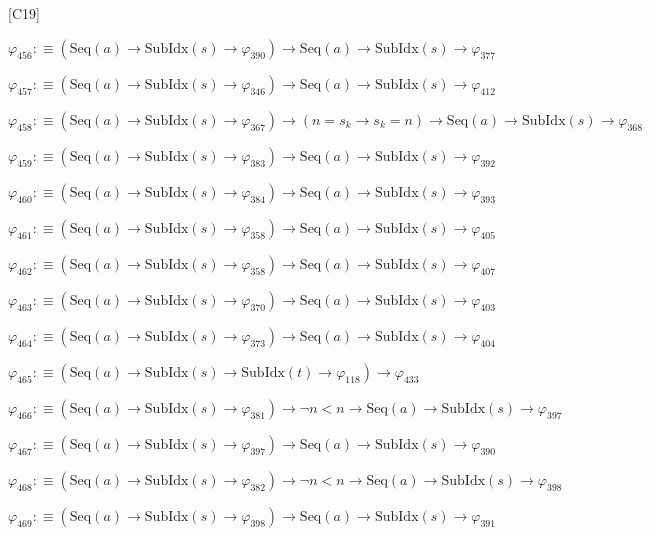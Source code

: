 \begin{fullproof}{[C19]}
\begin{abbrevlist}
\item $\varphi_{456} :\equiv (\mathrm{Seq}(a) \to \mathrm{SubIdx}(s) \to \varphi_{390}) \to \mathrm{Seq}(a) \to \mathrm{SubIdx}(s) \to \varphi_{377}$
\item $\varphi_{457} :\equiv (\mathrm{Seq}(a) \to \mathrm{SubIdx}(s) \to \varphi_{346}) \to \mathrm{Seq}(a) \to \mathrm{SubIdx}(s) \to \varphi_{412}$
\item $\varphi_{458} :\equiv (\mathrm{Seq}(a) \to \mathrm{SubIdx}(s) \to \varphi_{367}) \to (n = s_{k} \to s_{k} = n) \to \mathrm{Seq}(a) \to \mathrm{SubIdx}(s) \to \varphi_{368}$
\item $\varphi_{459} :\equiv (\mathrm{Seq}(a) \to \mathrm{SubIdx}(s) \to \varphi_{383}) \to \mathrm{Seq}(a) \to \mathrm{SubIdx}(s) \to \varphi_{392}$
\item $\varphi_{460} :\equiv (\mathrm{Seq}(a) \to \mathrm{SubIdx}(s) \to \varphi_{384}) \to \mathrm{Seq}(a) \to \mathrm{SubIdx}(s) \to \varphi_{393}$
\item $\varphi_{461} :\equiv (\mathrm{Seq}(a) \to \mathrm{SubIdx}(s) \to \varphi_{358}) \to \mathrm{Seq}(a) \to \mathrm{SubIdx}(s) \to \varphi_{405}$
\item $\varphi_{462} :\equiv (\mathrm{Seq}(a) \to \mathrm{SubIdx}(s) \to \varphi_{358}) \to \mathrm{Seq}(a) \to \mathrm{SubIdx}(s) \to \varphi_{407}$
\item $\varphi_{463} :\equiv (\mathrm{Seq}(a) \to \mathrm{SubIdx}(s) \to \varphi_{370}) \to \mathrm{Seq}(a) \to \mathrm{SubIdx}(s) \to \varphi_{403}$
\item $\varphi_{464} :\equiv (\mathrm{Seq}(a) \to \mathrm{SubIdx}(s) \to \varphi_{373}) \to \mathrm{Seq}(a) \to \mathrm{SubIdx}(s) \to \varphi_{404}$
\item $\varphi_{465} :\equiv (\mathrm{Seq}(a) \to \mathrm{SubIdx}(s) \to \mathrm{SubIdx}(t) \to \varphi_{118}) \to \varphi_{433}$
\item $\varphi_{466} :\equiv (\mathrm{Seq}(a) \to \mathrm{SubIdx}(s) \to \varphi_{381}) \to \neg n < n \to \mathrm{Seq}(a) \to \mathrm{SubIdx}(s) \to \varphi_{397}$
\item $\varphi_{467} :\equiv (\mathrm{Seq}(a) \to \mathrm{SubIdx}(s) \to \varphi_{397}) \to \mathrm{Seq}(a) \to \mathrm{SubIdx}(s) \to \varphi_{390}$
\item $\varphi_{468} :\equiv (\mathrm{Seq}(a) \to \mathrm{SubIdx}(s) \to \varphi_{382}) \to \neg n < n \to \mathrm{Seq}(a) \to \mathrm{SubIdx}(s) \to \varphi_{398}$
\item $\varphi_{469} :\equiv (\mathrm{Seq}(a) \to \mathrm{SubIdx}(s) \to \varphi_{398}) \to \mathrm{Seq}(a) \to \mathrm{SubIdx}(s) \to \varphi_{391}$

\end{abbrevlist}
\end{fullproof}
